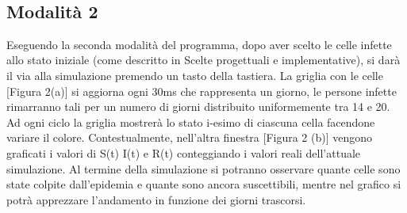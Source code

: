 \documentclass[a4paper,10 pt]{article}
\begin{document}
\begin{figure}[t]
\centering
{} \quad {} \\
\caption{}
\label{fig:subfig}
\end{figure}


\subsection{Modalità 2}
Eseguendo la seconda modalità del programma, dopo aver scelto le celle infette allo stato iniziale (come descritto in Scelte progettuali e implementative), si darà il via alla simulazione premendo un tasto della tastiera. La griglia con le celle [Figura 2(a)] si aggiorna ogni 30ms che rappresenta un giorno, le persone infette rimarranno tali per un numero di giorni distribuito uniformemente tra 14 e 20. Ad ogni ciclo la griglia mostrerà lo stato i-esimo di ciascuna cella facendone variare il colore. Contestualmente, nell'altra finestra [Figura 2 (b)] vengono graficati i valori di S(t) I(t) e R(t) conteggiando i valori reali dell'attuale simulazione. Al termine della simulazione si potranno osservare quante celle sono state colpite dall'epidemia e quante sono ancora suscettibili, mentre nel grafico si potrà apprezzare l'andamento in funzione dei giorni trascorsi.
\end{document}
